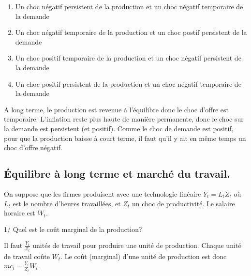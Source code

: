 \documentclass[
  letterpaper,
  DIV=11,
  numbers=noendperiod]{scrartcl}
\providecommand{\tightlist}{%
  \setlength{\itemsep}{0pt}\setlength{\parskip}{0pt}}\usepackage{longtable,booktabs,array}
\begin{document}
\begin{enumerate}
\def\labelenumi{\alph{enumi}.}
\tightlist
\item
  Un choc négatif persistent de la production et un choc négatif
  temporaire de la demande
\item
  Un choc négatif temporaire de la production et un choc postif
  persistent de la demande
\item
  Un choc positif temporaire de la production et un choc négatif
  persistent de la demande
\item
  Un choc positif persistent de la production et un choc négatif
  temporaire de la demande
\end{enumerate}

\begin{tcolorbox}[enhanced jigsaw, colbacktitle=quarto-callout-warning-color!10!white, rightrule=.15mm, left=2mm, leftrule=.75mm, colframe=quarto-callout-warning-color-frame, titlerule=0mm, colback=white, toptitle=1mm, bottomtitle=1mm, breakable, coltitle=black, title=\textcolor{quarto-callout-warning-color}{\faExclamationTriangle}\hspace{0.5em}{Correction}, bottomrule=.15mm, opacityback=0, arc=.35mm, toprule=.15mm, opacitybacktitle=0.6]

A long terme, le production est revenue à l'équilibre donc le choc
d'offre est temporaire. L'inflation reste plus haute de manière
permanente, donc le choc sur la demande est persistent (et positif).
Comme le choc de demande est positif, pour que la production baisse à
court terme, il faut qu'il y ait en même temps un choc d'offre négatif.

\end{tcolorbox}

\subsection{Équilibre à long terme et marché du
travail.}\label{uxe9quilibre-uxe0-long-terme-et-marchuxe9-du-travail.}

On suppose que les firmes produisent avec une technologie linéaire
\(Y_t = L_t Z_t\) où \(L_t\) est le nombre d'heures travaillées, et
\(Z_t\) un choc de productivité. Le salaire horaire est \(W_t\).

1/ Quel est le coût marginal de la production?

\begin{tcolorbox}[enhanced jigsaw, colbacktitle=quarto-callout-warning-color!10!white, rightrule=.15mm, left=2mm, leftrule=.75mm, colframe=quarto-callout-warning-color-frame, titlerule=0mm, colback=white, toptitle=1mm, bottomtitle=1mm, breakable, coltitle=black, title=\textcolor{quarto-callout-warning-color}{\faExclamationTriangle}\hspace{0.5em}{Correction}, bottomrule=.15mm, opacityback=0, arc=.35mm, toprule=.15mm, opacitybacktitle=0.6]

Il faut \(\frac{Y_t}{Z_t}\) unités de travail pour produire une unité de
production. Chaque unité de travail coûte \(W_t\). Le coût (marginal)
d'une unité de production est donc \({mc}_t=\frac{Y_t}{Z_t} W_t\).

\end{tcolorbox}
\end{document}
